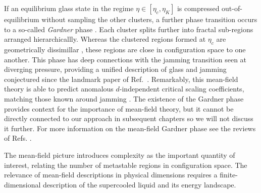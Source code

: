 \documentclass[11pt,twoside]{report}
\begin{document}
If an equilibrium glass state in the regime $\eta \in [\eta_c, \eta_K]$ is compressed out-of-equilibrium without sampling the other clusters, a further phase transition occurs to a so-called \emph{Gardner} phase \cite{KurchanJPCB2013,CharbonneauNC2014,CharbonneauJSM2014}.
Each cluster splits further into fractal sub-regions arranged hierarchicallly.
Whereas the clustered regions formed at $\eta_c$ are geometrically dissimillar%
,
these regions are close in configuration space to one another.
This phase has deep connections with the jamming transition seen at diverging pressure, providing a unified description of glass and jamming conjectured since the landmark paper of Ref.\ \cite{LiuN1998}.
Remarkably, this mean-field theory is able to predict anomalous $d$-independent critical scaling coefficients, matching those known around jamming \cite{WyartPRL2012,LernerSM2013,DeGiuliPNAS2014}.
The existence of the Gardner phase provides context for the importance of mean-field theory, but it cannot be directly connected to our approach in subsequent chapters so we will not discuss it further.
For more information on the mean-field Gardner phase see the reviews of Refs. \cite{BerthierJCP2019,CharbonneauARCMP2017}.


The mean-field picture introduces complexity as the important quantity of interest, relating the number of metastable regions in configuration space.
The relevance of mean-field descriptions in physical dimensions requires a finite-dimensional description of the supercooled liquid and its energy landscape.


\end{document}
